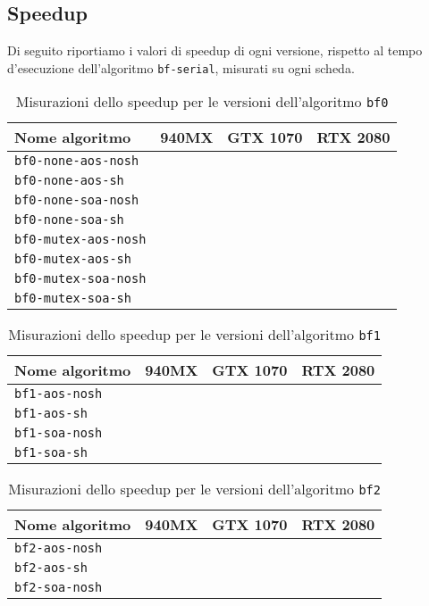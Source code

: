 \documentclass[a4paper]{article}
\begin{document}
	\subsection{Speedup}
	Di seguito riportiamo i valori di speedup di ogni versione, rispetto al tempo d'esecuzione dell'algoritmo \texttt{bf-serial}, misurati su ogni scheda.
	\begin{table}[!ht]
		\centering
		\begin{tabular}{|l|c|c|c|}
			\hline
			\textbf{Nome algoritmo} & \textbf{940MX} & \textbf{GTX 1070} & \textbf{RTX 2080} \\ \hline
			\texttt{bf0-none-aos-nosh}  &  &  &  \\ \hline
			\texttt{bf0-none-aos-sh}    &  &  &  \\ \hline
			\texttt{bf0-none-soa-nosh}  &  &  &  \\ \hline
			\texttt{bf0-none-soa-sh}    &  &  &  \\ \hline
			\texttt{bf0-mutex-aos-nosh} &  &  &  \\ \hline
			\texttt{bf0-mutex-aos-sh}   &  &  &  \\ \hline
			\texttt{bf0-mutex-soa-nosh} &  &  &  \\ \hline
			\texttt{bf0-mutex-soa-sh}   &  &  &  \\ \hline
		\end{tabular}
		\label{tab:speedup_bf0}
		\caption{Misurazioni dello speedup per le versioni dell'algoritmo \texttt{bf0}}
	\end{table}

	\begin{table}[!ht]
		\centering
		\begin{tabular}{|l|c|c|c|}
			\hline
			\textbf{Nome algoritmo} & \textbf{940MX} & \textbf{GTX 1070} & \textbf{RTX 2080} \\ \hline
			\texttt{bf1-aos-nosh}  &  &  &  \\ \hline
			\texttt{bf1-aos-sh}    &  &  &  \\ \hline
			\texttt{bf1-soa-nosh}  &  &  &  \\ \hline
			\texttt{bf1-soa-sh}    &  &  &  \\ \hline
		\end{tabular}
		\label{tab:speedup_bf1}
		\caption{Misurazioni dello speedup per le versioni dell'algoritmo \texttt{bf1}}
	\end{table}

	\begin{table}[!ht]
		\centering
		\begin{tabular}{|l|c|c|c|}
			\hline
			\textbf{Nome algoritmo} & \textbf{940MX} & \textbf{GTX 1070} & \textbf{RTX 2080} \\ \hline
			\texttt{bf2-aos-nosh}  &  &  &  \\ \hline
			\texttt{bf2-aos-sh}    &  &  &  \\ \hline
			\texttt{bf2-soa-nosh}  &  &  &  \\ \hline
		\end{tabular}
		\label{tab:speedup_bf2}
		\caption{Misurazioni dello speedup per le versioni dell'algoritmo \texttt{bf2}}
	\end{table}
	
\end{document}
